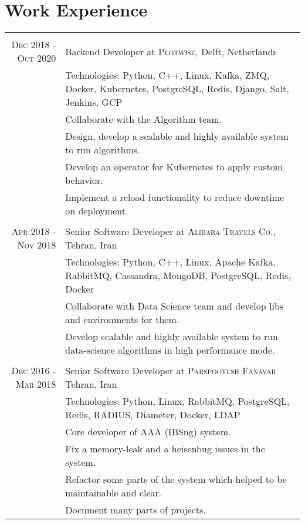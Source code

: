 \documentclass[a4paper,11pt]{article}
\begin{document}
\section{Work Experience}
\begin{tabular}{r|p{11cm}}

    \multicolumn{2}{c}{}\\
    \textsc{Dec 2018 - Oct 2020}
    & Backend Developer at \textsc{Plotwise},
    Delft, Netherlands\\
    &\footnotesize{Technologies: Python, C++, Linux, Kafka, ZMQ, Docker, Kubernetes, PostgreSQL, Redis, Django, Salt, Jenkins, GCP}\\
    &\footnotesize{Collaborate with the Algorithm team.}\\
    &\footnotesize{Design, develop a scalable and highly available system to run algorithms.}\\
    &\footnotesize{Develop an operator for Kubernetes to apply custom behavior.}\\
    &\footnotesize{Implement a reload functionality to reduce downtime on deployment.}\\

    \multicolumn{2}{c}{}\\
    \textsc{Apr 2018 - Nov 2018}
    & Senior Software Developer at \textsc{Alibaba Travels Co.},
    Tehran, Iran\\
    &\footnotesize{Technologies: Python, C++, Linux, Apache Kafka, RabbitMQ, Cassandra, MongoDB, PostgreSQL, Redis, Docker}\\
    &\footnotesize{Collaborate with Data Science team and develop libs and environments for them.}\\
    &\footnotesize{Develop scalable and highly available system to run data-science algorithms in high performance mode.}\\

    \multicolumn{2}{c}{}\\
    \textsc{Dec 2016 - Mar 2018}
    & Senior Software Developer at \textsc{Parspooyesh Fanavar}
    Tehran, Iran\\
    &\footnotesize{Technologies: Python, Linux, RabbitMQ, PostgreSQL, Redis, RADIUS, Diameter, Docker, LDAP}\\
    &\footnotesize{Core developer of AAA (IBSng) system.}\\
    &\footnotesize{Fix a memory-leak and a heisenbug issues in the system.}\\
    &\footnotesize{Refactor some parts of the system which helped to be maintainable and clear.}\\
    &\footnotesize{Document many parts of projects.}\\


\end{tabular}
\end{document}
